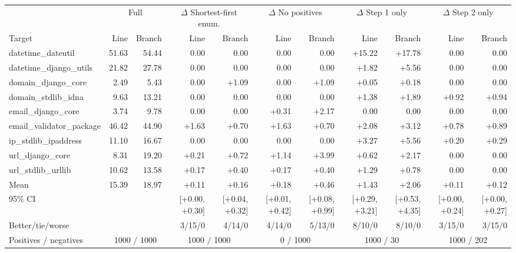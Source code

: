 \begin{tabular}{l rr rr rr rr rr}
\toprule
 & \multicolumn{2}{c}{Full} & \multicolumn{2}{c}{$\Delta$ Shortest-first enum.} & \multicolumn{2}{c}{$\Delta$ No positives} & \multicolumn{2}{c}{$\Delta$ Step 1 only} & \multicolumn{2}{c}{$\Delta$ Step 2 only} \\
\cmidrule(lr){2-3}\cmidrule(lr){4-5}\cmidrule(lr){6-7}\cmidrule(lr){8-9}\cmidrule(lr){10-11}
Target & Line & Branch & Line & Branch & Line & Branch & Line & Branch & Line & Branch \\
\midrule
datetime\_dateutil & 51.63 & 54.44 & \phantom{+}0.00 & \phantom{+}0.00 & \phantom{+}0.00 & \phantom{+}0.00 & +15.22 & +17.78 & \phantom{+}0.00 & \phantom{+}0.00 \\
datetime\_django\_utils & 21.82 & 27.78 & \phantom{+}0.00 & \phantom{+}0.00 & \phantom{+}0.00 & \phantom{+}0.00 & +1.82 & +5.56 & \phantom{+}0.00 & \phantom{+}0.00 \\
domain\_django\_core & 2.49 & 5.43 & \phantom{+}0.00 & +1.09 & \phantom{+}0.00 & +1.09 & +0.05 & +0.18 & \phantom{+}0.00 & \phantom{+}0.00 \\
domain\_stdlib\_idna & 9.63 & 13.21 & \phantom{+}0.00 & \phantom{+}0.00 & \phantom{+}0.00 & \phantom{+}0.00 & +1.38 & +1.89 & +0.92 & +0.94 \\
email\_django\_core & 3.74 & 9.78 & \phantom{+}0.00 & \phantom{+}0.00 & +0.31 & +2.17 & \phantom{+}0.00 & \phantom{+}0.00 & \phantom{+}0.00 & \phantom{+}0.00 \\
email\_validator\_package & 46.42 & 44.90 & +1.63 & +0.70 & +1.63 & +0.70 & +2.08 & +3.12 & +0.78 & +0.89 \\
ip\_stdlib\_ipaddress & 11.10 & 16.67 & \phantom{+}0.00 & \phantom{+}0.00 & \phantom{+}0.00 & \phantom{+}0.00 & +3.27 & +5.56 & +0.20 & +0.29 \\
url\_django\_core & 8.31 & 19.20 & +0.21 & +0.72 & +1.14 & +3.99 & +0.62 & +2.17 & \phantom{+}0.00 & \phantom{+}0.00 \\
url\_stdlib\_urllib & 10.62 & 13.58 & +0.17 & +0.40 & +0.17 & +0.40 & +1.29 & +0.78 & \phantom{+}0.00 & \phantom{+}0.00 \\
\midrule
Mean & 15.39 & 18.97 & +0.11 & +0.16 & +0.18 & +0.46 & +1.43 & +2.06 & +0.11 & +0.12 \\
95\% CI & & & [+0.00, +0.30] & [+0.04, +0.32] & [+0.01, +0.42] & [+0.08, +0.99] & [+0.29, +3.21] & [+0.53, +4.35] & [+0.00, +0.24] & [+0.00, +0.27] \\
Better/tie/worse & & & 3/15/0 & 4/14/0 & 4/14/0 & 5/13/0 & 8/10/0 & 8/10/0 & 3/15/0 & 3/15/0 \\
Positives / negatives & \multicolumn{2}{c}{1000 / 1000} & \multicolumn{2}{c}{1000 / 1000} & \multicolumn{2}{c}{0 / 1000} & \multicolumn{2}{c}{1000 / 30} & \multicolumn{2}{c}{1000 / 202} \\
\bottomrule
\end{tabular}
